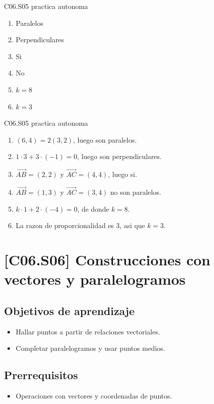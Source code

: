 \begin{shortanswer}{C06.S05 practica autonoma}
\begin{enumerate}[label=\textbf{PX-C06.S05-\arabic*:}, leftmargin=*]
  \item Paralelos
  \item Perpendiculares
  \item Si
  \item No
  \item \(k=8\)
  \item \(k=3\)
\end{enumerate}
\end{shortanswer}

\begin{fullsolution}{C06.S05 practica autonoma}
\begin{enumerate}[label=\textbf{PX-C06.S05-\arabic*:}, leftmargin=*]
  \item \((6,4)=2(3,2)\), luego son paralelos.
  \item \(1\cdot 3+3\cdot (-1)=0\), luego son perpendiculares.
  \item \(\overrightarrow{AB}=(2,2)\) y \(\overrightarrow{AC}=(4,4)\), luego si.
  \item \(\overrightarrow{AB}=(1,3)\) y \(\overrightarrow{AC}=(3,4)\) no son paralelos.
  \item \(k\cdot 1+2\cdot (-4)=0\), de donde \(k=8\).
  \item La razon de proporcionalidad es \(3\), asi que \(k=3\).
\end{enumerate}
\end{fullsolution}

\section{[C06.S06] Construcciones con vectores y paralelogramos}

\subsection*{Objetivos de aprendizaje}
\begin{itemize}
  \item Hallar puntos a partir de relaciones vectoriales.
  \item Completar paralelogramos y usar puntos medios.
\end{itemize}

\subsection*{Prerrequisitos}
\begin{itemize}
  \item Operaciones con vectores y coordenadas de puntos.
\end{itemize}

